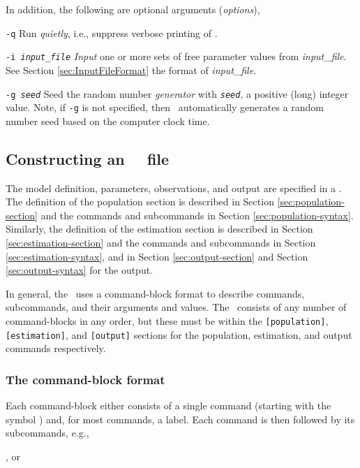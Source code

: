 In addition, the following are optional arguments (\emph{options}),

\begin{description}

\item \texttt{-q} Run \emph{quietly}, i.e., suppress verbose printing of \SPM.

\item \texttt{-i \emph{input\_file}} \emph{Input} one or more sets of free parameter values from \emph{input\_file}. See Section \ref{sec:InputFileFormat} the format of \emph{input\_file}.

\item \texttt{-g \emph{seed}} Seed the random number \emph{generator} with \texttt{\emph{seed}}, a positive (long) integer value. Note, if \texttt{-g} is not specified, then \SPM\ automatically generates a random number seed based on the computer clock time. 

\end{description}

\subsection{Constructing an \SPM\ \config\ file\label{constructing-spm-config}}

The model definition, parameters, observations, and output are specified in a \config. The definition of the population section is described in Section \ref{sec:population-section} and the commands and subcommands in Section \ref{sec:population-syntax}. Similarly, the definition of the estimation section is described in Section \ref{sec:estimation-section} and the commands and subcommands in Section \ref{sec:estimation-syntax}, and in Section \ref{sec:output-section} and Section \ref{sec:output-syntax} for the output. 

In general, the \config\ uses a command-block format to describe commands, subcommands, and their arguments and values. The \config\ consists of any number of command-blocks in any order, but these must be within the \texttt{[population]}, \texttt{[estimation]}, and  \texttt{[output]} sections for the population, estimation, and output commands respectively. 

\subsubsection{The command-block format}

Each command-block either consists of a single command (starting with the symbol \@) and, for most commands, a label. Each command is then followed by its subcommands, e.g., 
\begin{description}
\item {}, or 
\item {}
\end{description}

